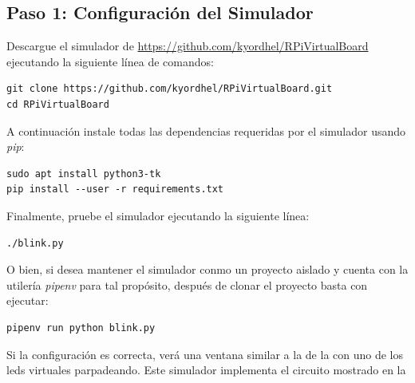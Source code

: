 %
%


\subsection{Paso 1: Configuración del Simulador}%
\label{sec:step1}

Descargue el simulador de \url{https://github.com/kyordhel/RPiVirtualBoard} ejecutando la siguiente línea de comandos:

\begin{Verbatim}[fontsize=\footnotesize]
git clone https://github.com/kyordhel/RPiVirtualBoard.git
cd RPiVirtualBoard
\end{Verbatim}

A continuación instale todas las dependencias requeridas por el simulador usando \emph{pip}:

\begin{Verbatim}[fontsize=\footnotesize]
sudo apt install python3-tk
pip install --user -r requirements.txt
\end{Verbatim}

Finalmente, pruebe el simulador ejecutando la siguiente línea:

\begin{Verbatim}[fontsize=\footnotesize]
./blink.py
\end{Verbatim}

O bien, si desea mantener el simulador conmo un proyecto aislado y cuenta con la utilería \emph{pipenv}\footnotemark{} para tal propósito, después de clonar el proyecto basta con ejecutar:

\begin{Verbatim}[fontsize=\footnotesize]
pipenv run python blink.py
\end{Verbatim}

Si la configuración es correcta, verá una ventana similar a la de la  con uno de los leds virtuales parpadeando.
Este simulador implementa el circuito mostrado en la 

